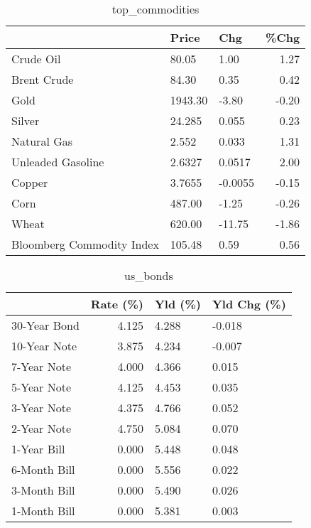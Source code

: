 \documentclass{article}%
\begin{document}
\begin{table}[htbp]%
\caption{top\_commodities}%
\centering%
\begin{adjustbox}{width=1\textwidth}%
\begin{tabular}{lllr}
\toprule
                          &   Price &     Chg &  \%Chg \\
\midrule
               Crude Oil  &   80.05 &    1.00 &  1.27 \\
             Brent Crude  &   84.30 &    0.35 &  0.42 \\
                    Gold  & 1943.30 &   -3.80 & -0.20 \\
                  Silver  &  24.285 &   0.055 &  0.23 \\
             Natural Gas  &   2.552 &   0.033 &  1.31 \\
       Unleaded Gasoline  &  2.6327 &  0.0517 &  2.00 \\
                  Copper  &  3.7655 & -0.0055 & -0.15 \\
                    Corn  &  487.00 &   -1.25 & -0.26 \\
                   Wheat  &  620.00 &  -11.75 & -1.86 \\
Bloomberg Commodity Index &  105.48 &    0.59 &  0.56 \\
\bottomrule
\end{tabular}
%
\end{adjustbox}%
\end{table}

%


\begin{table}[htbp]%
\caption{us\_bonds}%
\centering%
\begin{adjustbox}{width=1\textwidth}%
\begin{tabular}{lrll}
\toprule
             &  Rate (\%) & Yld (\%) & Yld Chg (\%) \\
\midrule
30-Year Bond &     4.125 &   4.288 &      -0.018 \\
10-Year Note &     3.875 &   4.234 &      -0.007 \\
 7-Year Note &     4.000 &   4.366 &       0.015 \\
 5-Year Note &     4.125 &   4.453 &       0.035 \\
 3-Year Note &     4.375 &   4.766 &       0.052 \\
 2-Year Note &     4.750 &   5.084 &       0.070 \\
 1-Year Bill &     0.000 &   5.448 &       0.048 \\
6-Month Bill &     0.000 &   5.556 &       0.022 \\
3-Month Bill &     0.000 &   5.490 &       0.026 \\
1-Month Bill &     0.000 &   5.381 &       0.003 \\
\bottomrule
\end{tabular}
%
\end{adjustbox}%
\end{table}
\end{document}
